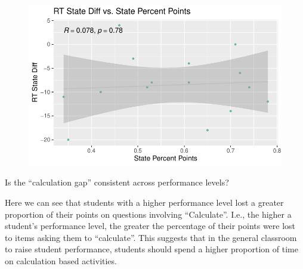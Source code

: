 \documentclass[
  letterpaper,
  DIV=11,
  numbers=noendperiod]{scrartcl}
\begin{document}
\begin{figure}[H]

{\centering \includegraphics{theresaSzczepanski_final_files/figure-pdf/unnamed-chunk-25-1.pdf}

}

\end{figure}

Is the ``calculation gap'' consistent across performance levels?

Here we can see that students with a higher performance level lost a
greater proportion of their points on questions involving ``Calculate''.
I.e., the higher a student's performance level, the greater the
percentage of their points were lost to items asking them to
``calculate''. This suggests that in the general classroom to raise
student performance, students should spend a higher proportion of time
on calculation based activities.
\end{document}
